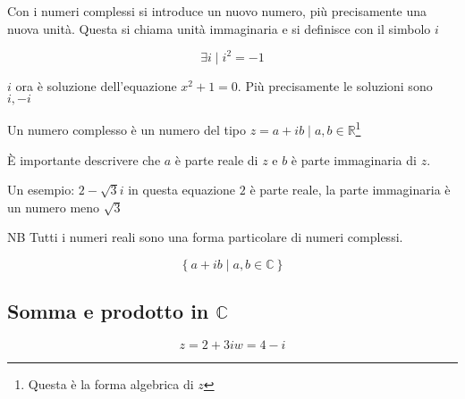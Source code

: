 Con i numeri complessi si introduce un nuovo numero, più precisamente una nuova unità. Questa si chiama unità immaginaria e si definisce con il simbolo $i$

\[ \exists i \mid i^2 = -1 \]

$i$ ora è soluzione dell'equazione $x^2 + 1 = 0$. Più precisamente le soluzioni sono $ i, -i$


Un numero complesso è un numero del tipo $z = a+ib \mid a,b \in \mathbb{R}$\footnote{Questa è la forma algebrica di $z$}

È importante descrivere che $a$ è parte reale di $z$ e $b$ è parte immaginaria di $z$.

Un esempio: $2-\sqrt{3}i$ in questa equazione $2$ è parte reale, la parte immaginaria è un numero meno $\sqrt{3}$

NB Tutti i numeri reali sono una forma particolare di numeri complessi.

\[ \left\{a+ib \mid a,b \in \mathbb{C} \right\} \]

\subsection{Somma e prodotto in $\mathbb{C}$}

\begin{equation*}
    z = 2 +3i
    w = 4-i
\end{equation*}
